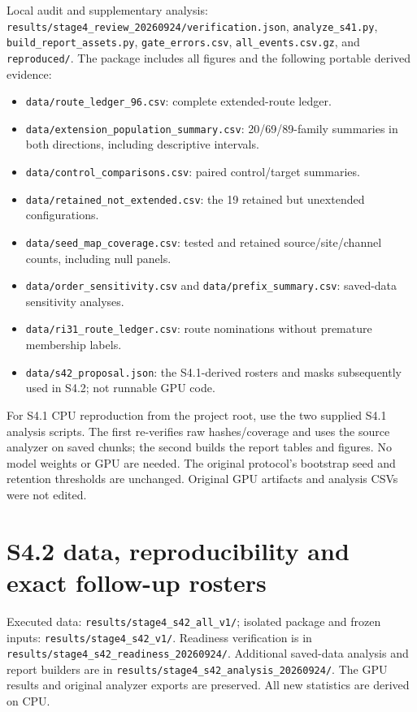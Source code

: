 \documentclass[11pt,a4paper]{article}
\newcommand{\file}[1]{\nolinkurl{#1}}
\begin{document}
Local audit and supplementary analysis:
\file{results/stage4_review_20260924/verification.json},
\file{analyze_s41.py}, \file{build_report_assets.py},
\file{gate_errors.csv}, \file{all_events.csv.gz}, and \file{reproduced/}.
The package includes all figures and the following portable derived evidence:
\begin{itemize}
\item \file{data/route_ledger_96.csv}: complete extended-route ledger.
\item \file{data/extension_population_summary.csv}: 20/69/89-family summaries in both directions, including descriptive intervals.
\item \file{data/control_comparisons.csv}: paired control/target summaries.
\item \file{data/retained_not_extended.csv}: the 19 retained but unextended configurations.
\item \file{data/seed_map_coverage.csv}: tested and retained source/site/channel counts, including null panels.
\item \file{data/order_sensitivity.csv} and \file{data/prefix_summary.csv}: saved-data sensitivity analyses.
\item \file{data/ri31_route_ledger.csv}: route nominations without premature membership labels.
\item \file{data/s42_proposal.json}: the S4.1-derived rosters and masks subsequently used in S4.2; not runnable GPU code.
\end{itemize}

For S4.1 CPU reproduction from the project root, use the two supplied S4.1 analysis scripts. The first re-verifies raw hashes/coverage and uses the source analyzer on saved chunks; the second builds the report tables and figures. No model weights or GPU are needed. The original protocol's bootstrap seed and retention thresholds are unchanged. Original GPU artifacts and analysis CSVs were not edited.

\section{S4.2 data, reproducibility and exact follow-up rosters}
\label{sec:future_rosters}
Executed data: \file{results/stage4_s42_all_v1/}; isolated package and frozen inputs: \file{results/stage4_s42_v1/}. Readiness verification is in \file{results/stage4_s42_readiness_20260924/}. Additional saved-data analysis and report builders are in \file{results/stage4_s42_analysis_20260924/}. The GPU results and original analyzer exports are preserved. All new statistics are derived on CPU.
\end{document}
